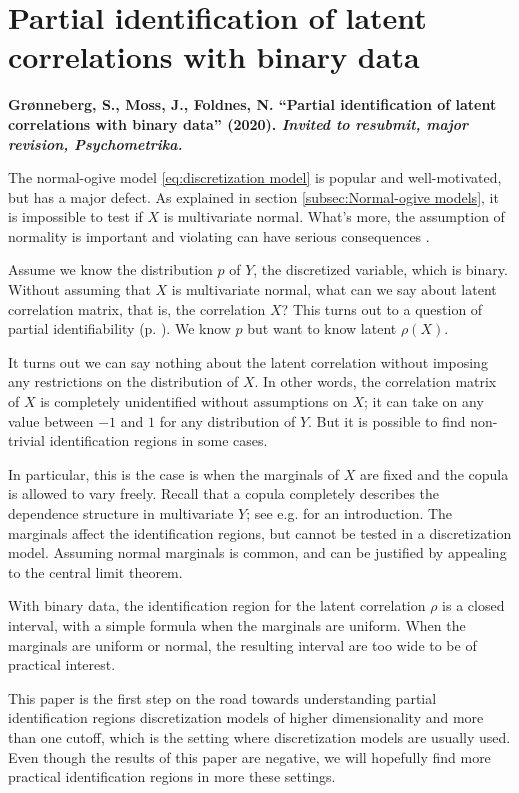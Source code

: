 \section{Partial identification of
latent correlations with binary data}
\textbf{Grønneberg, S., Moss, J., Foldnes, N. ``Partial identification of
latent correlations with binary data'' (2020). \emph{Invited to resubmit, major revision, Psychometrika.}}

The normal-ogive model \eqref{eq:discretization model} is popular and well-motivated, but has a major defect. As explained in section \ref{subsec:Normal-ogive models}, it is impossible to test if $X$ is multivariate normal. What's more, the assumption of normality is important and violating can have serious consequences \parencite{Foldnes2019-ew}. 

Assume we know the distribution $p$ of $Y$, the discretized variable, which is binary. Without assuming that $X$ is multivariate normal, what can we say about latent correlation matrix, that is, the correlation $X$? This turns out to a question of partial identifiability (p. \pageref{sec:partial identification}). We know $p$ but want to know latent $\rho(X)$.

It turns out we can say nothing about the latent correlation without imposing any restrictions on the distribution of $X$. In other words, the correlation matrix of $X$ is completely unidentified without assumptions on $X$; it can take on any value between $-1$ and $1$ for any distribution of $Y$. But it is possible to find non-trivial identification regions in some cases.

In particular, this is the case is when the marginals of $X$ are fixed and the copula is allowed to vary freely. Recall that a copula completely describes the dependence structure in multivariate $Y$; see e.g. \textcite{Nelsen2007-qj} for an introduction. The marginals affect the identification regions, but cannot be tested in a discretization model. Assuming normal marginals is common, and can be justified by appealing to the central limit theorem.

With binary data, the identification region for the latent correlation $\rho$ is a closed interval, with a simple formula when the marginals are uniform. When the marginals are uniform or normal, the resulting interval are too wide to be of practical interest. 

This paper is the first step on the road towards understanding partial identification regions discretization models of higher dimensionality and more than one cutoff, which is the setting where discretization models are usually used. Even though the results of this paper are negative, we will hopefully find more practical identification regions in more these settings.

